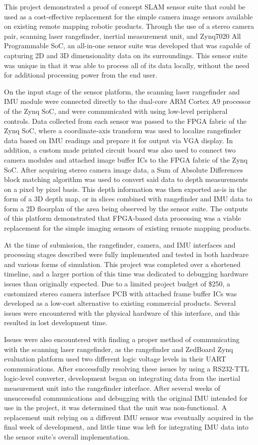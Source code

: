 This project demonstrated a proof of concept SLAM sensor suite that could be used as a cost-effective replacement for the simple camera image sensors available on existing remote mapping robotic products. Through the use of a stereo camera pair, scanning laser rangefinder, inertial measurement unit, and Zynq7020 All Programmable SoC, an all-in-one sensor suite was developed that was capable of capturing 2D and 3D dimensionality data on its surroundings. This sensor suite was unique in that it was able to process all of its data locally, without the need for additional processing power from the end user.
\par
On the input stage of the sensor platform, the scanning laser rangefinder and IMU module were connected directly to the dual-core ARM Cortex A9 processor of the Zynq SoC, and were communicated with using low-level peripheral controls. Data collected from each sensor was passed to the FPGA fabric of the Zynq SoC, where a coordinate-axis transform was used to localize rangefinder data based on IMU readings and prepare it for output via VGA display. In addition, a custom made printed circuit board was also used to connect two camera modules and attached image buffer ICs to the FPGA fabric of the Zynq SoC. After acquiring stereo camera image data, a Sum of Absolute Differences block matching algorithm was used to convert said data to depth measurements on a pixel by pixel basis. This depth information was then exported as-is in the form of a 3D depth map, or in slices combined with rangefinder and IMU data to form a 2D floorplan of the area being observed by the sensor suite. The outputs of this platform demonstrated that FPGA-based data processing was a viable replacement for the simple imaging sensors of existing remote mapping products. 
\par
At the time of submission, the rangefinder, camera, and IMU interfaces and processing stages described were fully implemented and tested in both hardware and various forms of simulation. This project was completed over a shortened timeline, and a larger portion of this time was dedicated to debugging hardware issues than originally expected. Due to a limited project budget of \$250, a customized stereo camera interface PCB with attached frame buffer ICs was developed as a low-cost alternative to existing commercial products. Several issues were encountered with the physical hardware of this interface, and this resulted in lost development time. 
\par
Issues were also encountered with finding a proper method of communicating with the scanning laser rangefinder, as the rangefinder and ZedBoard Zynq evaluation platform used two different logic voltage levels in their UART communications.  After successfully resolving these issues by using a RS232-TTL logic-level converter, development began on integrating data from the inertial measurement unit into the rangefinder interface. After several weeks of unsuccessful communications and debugging with the original IMU intended for use in the project, it was determined that the unit was non-functional. A replacement unit relying on a different IMU sensor was eventually acquired in the final week of development, and little time was left for integrating IMU data into the sensor suite's overall implementation.
